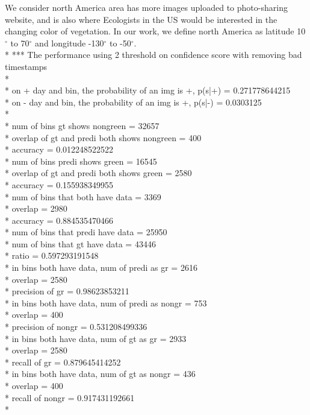 We consider north America area has more images uploaded to photo-sharing website, and is also where Ecologists in the US would be interested in the changing color of vegetation. In our work, we define north America as latitude 10$^{\circ}$ to 70$^{\circ}$ and longitude -130$^{\circ}$ to -50$^{\circ}$.
\hfill \break
\hfill \break
{}
\\*
*** The performance using 2 threshold on confidence score with removing bad timestamps\\*
\\*
on + day and bin, the probability of an img is +, p(s|+) = 0.271778644215\\*
on - day and bin, the probability of an img is +, p(s|-) = 0.0303125\\*
\\*
num of bins gt shows nongreen = 32657\\*
overlap of gt and predi both shows nongreen = 400\\*
accuracy = 0.012248522522\\*
num of bins predi shows green = 16545\\*
overlap of gt and predi both shows green = 2580\\*
accuracy = 0.155938349955\\*
num of bins that both have data = 3369\\*
overlap = 2980\\*
accuracy = 0.884535470466\\*
num of bins that predi have data = 25950\\*
num of bins that gt have data = 43446\\*
ratio = 0.597293191548\\*
in bins both have data, num of predi as gr = 2616\\*
overlap = 2580\\*
precision of gr = 0.98623853211\\*
in bins both have data, num of predi as nongr = 753\\*
overlap = 400\\*
precision of nongr = 0.531208499336\\*
in bins both have data, num of gt as gr = 2933\\*
overlap = 2580\\*
recall of gr = 0.879645414252\\*
in bins both have data, num of gt as nongr = 436\\*
overlap = 400\\*
recall of nongr = 0.917431192661\\*


